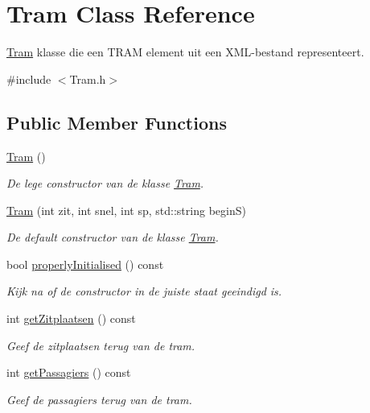 \hypertarget{class_tram}{}\section{Tram Class Reference}
\label{class_tram}


\hyperlink{class_tram}{Tram} klasse die een T\+R\+AM element uit een X\+M\+L-\/bestand representeert.  




{\ttfamily \#include $<$Tram.\+h$>$}

\subsection*{Public Member Functions}
\begin{DoxyCompactItemize}
\item 
\hyperlink{class_tram_aad83b2e7e79d57528691bf317ab0e1ef}{Tram} ()
\begin{DoxyCompactList}\small\item\em De lege constructor van de klasse \hyperlink{class_tram}{Tram}. \end{DoxyCompactList}\item 
\hyperlink{class_tram_afef6559a85225dc0b8a9445d6d16cbbb}{Tram} (int zit, int snel, int sp, std\+::string beginS)
\begin{DoxyCompactList}\small\item\em De default constructor van de klasse \hyperlink{class_tram}{Tram}. \end{DoxyCompactList}\item 
bool \hyperlink{class_tram_a98992eff0453f54fbe64e1f1064169c7}{properly\+Initialised} () const 
\begin{DoxyCompactList}\small\item\em Kijk na of de constructor in de juiste staat geeindigd is. \end{DoxyCompactList}\item 
int \hyperlink{class_tram_aa366e37291186d6cfd402aa7b6cfec2d}{get\+Zitplaatsen} () const 
\begin{DoxyCompactList}\small\item\em Geef de zitplaatsen terug van de tram. \end{DoxyCompactList}\item 
int \hyperlink{class_tram_a8e9e449f0032f0f439c196e0980a891e}{get\+Passagiers} () const 
\begin{DoxyCompactList}\small\item\em Geef de passagiers terug van de tram. \end{DoxyCompactList}\item 

\end{DoxyCompactItemize}
